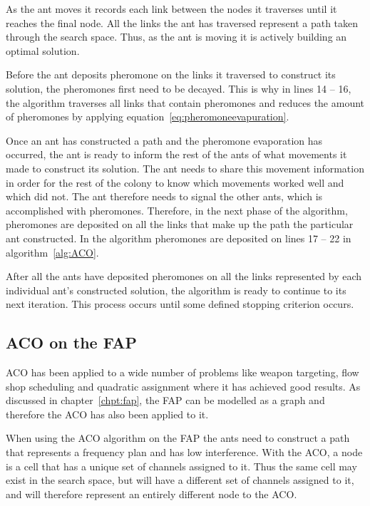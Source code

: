 As the ant moves it records each link between the nodes it traverses until it reaches the final node. All the links the ant has traversed represent a path taken through the search space\cite{CompuIntelligenceIntro,FundamentalSwarm}. Thus, as the ant is moving it is actively building an optimal solution.

Before the ant deposits pheromone on the links it traversed to construct its solution, the pheromones first need to be decayed. This is why in lines 14 -- 16, the algorithm traverses all links that contain pheromones and reduces the amount of pheromones by applying equation~\ref{eq:pheromoneevapuration}.

Once an ant has constructed a path and the pheromone evaporation has occurred, the ant is ready to inform the rest of the ants of what movements it made to construct its solution. The ant needs to share this movement information in order for the rest of the colony to know which movements worked well and which did not. The ant therefore needs to signal the other ants, which is accomplished with pheromones. Therefore, in the next phase of the algorithm, pheromones are deposited on all the links that make up the path the particular ant constructed. In the algorithm pheromones are deposited on lines 17 -- 22 in algorithm~\ref{alg:ACO}.

After all the ants have deposited pheromones on all the links represented by each individual ant's constructed solution, the algorithm is ready to continue to its next iteration. This process occurs until some defined stopping criterion occurs.

\subsection{ACO on the \gls{FAP}}
ACO has been applied to a wide number of problems like weapon targeting\cite{WeaponTargetACO}, flow shop scheduling\cite{ACOFlowShop} and quadratic assignment\cite{AntQAP} where it has achieved good results. As discussed in chapter~\ref{chpt:fap}, the \gls{FAP} can be modelled as a graph and therefore the \gls{ACO} has also been applied to it\cite{ACOvsEA}.

When using the \gls{ACO} algorithm on the \gls{FAP} the ants need to construct a path that represents a frequency plan and has low interference. With the \gls{ACO}, a node is a cell that has a unique set of channels assigned to it. Thus the same cell may exist in the search space, but will have a different set of channels assigned to it, and will therefore represent an entirely different node to the \gls{ACO}.

